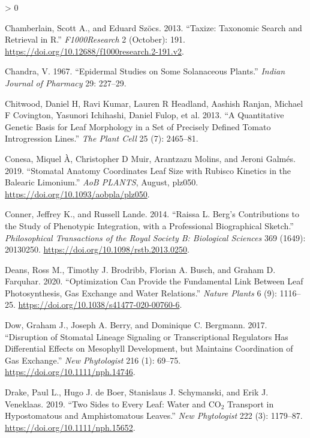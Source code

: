 \documentclass[
  10pt,
]{article}
\newlength{\cslhangindent}
\newenvironment{CSLReferences}[2] %
 {%
  \setlength{\parindent}{0pt}
  \ifodd #1 \everypar{\setlength{\hangindent}{\cslhangindent}}\ignorespaces\fi
  \ifnum #2 > 0
  \setlength{\parskip}{#2\baselineskip}
  \fi
 }%
 {}
\begin{document}
\begin{CSLReferences}{1}{0}
\leavevmode\hypertarget{ref-chamberlain_taxize_2013}{}%
Chamberlain, Scott A., and Eduard Szöcs. 2013. {``Taxize: Taxonomic Search and Retrieval in {R}.''} \emph{F1000Research} 2 (October): 191. \url{https://doi.org/10.12688/f1000research.2-191.v2}.

\leavevmode\hypertarget{ref-chandra_epidermal_1967}{}%
Chandra, V. 1967. {``Epidermal Studies on Some {Solanaceous} Plants.''} \emph{Indian Journal of Pharmacy} 29: 227--29.

\leavevmode\hypertarget{ref-chitwood_quantitative_2013}{}%
Chitwood, Daniel H, Ravi Kumar, Lauren R Headland, Aashish Ranjan, Michael F Covington, Yasunori Ichihashi, Daniel Fulop, et al. 2013. {``A Quantitative Genetic Basis for Leaf Morphology in a Set of Precisely Defined Tomato Introgression Lines.''} \emph{The Plant Cell} 25 (7): 2465--81.

\leavevmode\hypertarget{ref-conesa_stomatal_2019}{}%
Conesa, Miquel À, Christopher D Muir, Arantzazu Molins, and Jeroni Galmés. 2019. {``Stomatal Anatomy Coordinates Leaf Size with {Rubisco} Kinetics in the {Balearic} {Limonium}.''} \emph{AoB PLANTS}, August, plz050. \url{https://doi.org/10.1093/aobpla/plz050}.

\leavevmode\hypertarget{ref-conner_raissa_2014}{}%
Conner, Jeffrey K., and Russell Lande. 2014. {``Raissa {L}. {Berg}'s Contributions to the Study of Phenotypic Integration, with a Professional Biographical Sketch.''} \emph{Philosophical Transactions of the Royal Society B: Biological Sciences} 369 (1649): 20130250. \url{https://doi.org/10.1098/rstb.2013.0250}.

\leavevmode\hypertarget{ref-deans_optimization_2020}{}%
Deans, Ross M., Timothy J. Brodribb, Florian A. Busch, and Graham D. Farquhar. 2020. {``Optimization Can Provide the Fundamental Link Between Leaf Photosynthesis, Gas Exchange and Water Relations.''} \emph{Nature Plants} 6 (9): 1116--25. \url{https://doi.org/10.1038/s41477-020-00760-6}.

\leavevmode\hypertarget{ref-dow_disruption_2017}{}%
Dow, Graham J., Joseph A. Berry, and Dominique C. Bergmann. 2017. {``Disruption of Stomatal Lineage Signaling or Transcriptional Regulators Has Differential Effects on Mesophyll Development, but Maintains Coordination of Gas Exchange.''} \emph{New Phytologist} 216 (1): 69--75. \url{https://doi.org/10.1111/nph.14746}.

\leavevmode\hypertarget{ref-drake_two_2019}{}%
Drake, Paul L., Hugo J. de Boer, Stanislaus J. Schymanski, and Erik J. Veneklaas. 2019. {``Two Sides to Every Leaf: Water and {CO}\(_{\textrm{2}}\) Transport in Hypostomatous and Amphistomatous Leaves.''} \emph{New Phytologist} 222 (3): 1179--87. \url{https://doi.org/10.1111/nph.15652}.


\end{CSLReferences}
\end{document}
